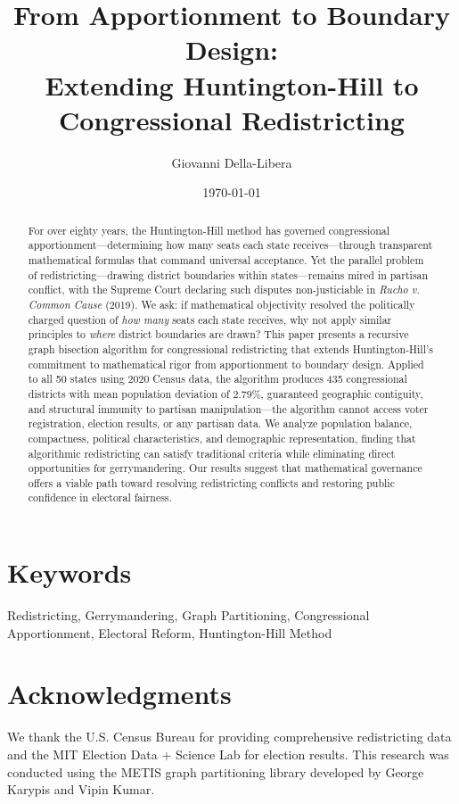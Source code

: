 \documentclass[12pt]{article}
\title{\textbf{From Apportionment to Boundary Design:\\
Extending Huntington-Hill to Congressional Redistricting}}
\author{
Giovanni Della-Libera
}
\date{\today}
\begin{document}
\maketitle

\begin{abstract}
For over eighty years, the Huntington-Hill method has governed congressional apportionment—determining how many seats each state receives—through transparent mathematical formulas that command universal acceptance. Yet the parallel problem of redistricting—drawing district boundaries within states—remains mired in partisan conflict, with the Supreme Court declaring such disputes non-justiciable in \textit{Rucho v. Common Cause} (2019). We ask: if mathematical objectivity resolved the politically charged question of \textit{how many} seats each state receives, why not apply similar principles to \textit{where} district boundaries are drawn? This paper presents a recursive graph bisection algorithm for congressional redistricting that extends Huntington-Hill's commitment to mathematical rigor from apportionment to boundary design. Applied to all 50 states using 2020 Census data, the algorithm produces 435 congressional districts with mean population deviation of 2.79\%, guaranteed geographic contiguity, and structural immunity to partisan manipulation—the algorithm cannot access voter registration, election results, or any partisan data. We analyze population balance, compactness, political characteristics, and demographic representation, finding that algorithmic redistricting can satisfy traditional criteria while eliminating direct opportunities for gerrymandering. Our results suggest that mathematical governance offers a viable path toward resolving redistricting conflicts and restoring public confidence in electoral fairness.
\end{abstract}

\section*{Keywords}
Redistricting, Gerrymandering, Graph Partitioning, Congressional Apportionment, Electoral Reform, Huntington-Hill Method









\section*{Acknowledgments}
We thank the U.S. Census Bureau for providing comprehensive redistricting data and the MIT Election Data + Science Lab for election results. This research was conducted using the METIS graph partitioning library developed by George Karypis and Vipin Kumar.



\end{document}

